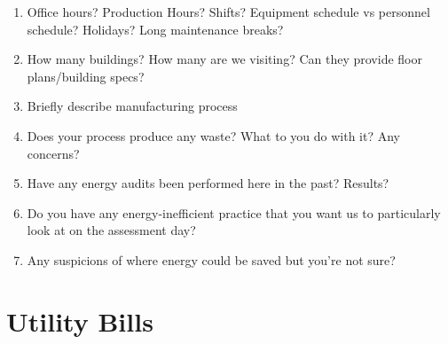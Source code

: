 \documentclass[./main.tex]{subfiles}
\begin{document}
\begin{enumerate}[leftmargin=*]
\item Office hours? Production Hours? Shifts? Equipment schedule vs personnel schedule? Holidays? Long maintenance breaks?

\vspace{\answerspace}

\item How many buildings? How many are we visiting? Can they provide floor plans/building specs?

\vspace{\answerspace}

\item Briefly describe manufacturing process

\vspace{\answerspace}

\item Does your process produce any waste? What to you do with it? Any concerns?

\vspace{\answerspace}

\item Have any energy audits been performed here in the past? Results?

\vspace{\answerspace}

\item Do you have any energy-inefficient practice that you want us to particularly look at on the assessment day?

\vspace{\answerspace}

\item Any suspicions of where energy could be saved but you're not sure?

\vspace{\answerspace}


\end{enumerate}

\section*{Utility Bills}
\end{document}
